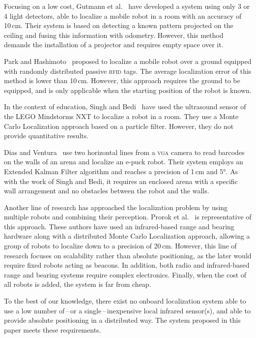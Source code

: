 \documentclass[letterpaper, 10pt, conference]{ieeeconf}
\begin{document}
Focusing on a low cost, Gutmann et al.~\cite{gutmann2013challenges} have developed a system using only 3 or 4 light detectors, able to localize a mobile robot in a room with an accuracy of 10\,cm.
Their system is based on detecting a known pattern projected on the ceiling and fusing this information with odometry.
However, this method demands the installation of a projector and requires empty space over it.

Park and Hashimoto~\cite{park2009approach} proposed to localize a mobile robot over a ground equipped with randomly distributed passive \textsc{rfid} tags.
The average localization error of this method is lower than 10\,cm.
However, this approach requires the ground to be equipped, and is only applicable when the starting position of the robot is known.

In the context of education, Singh and Bedi~\cite{singh2013map} have used the ultrasound sensor of the LEGO Mindstorms NXT to localize a robot in a room.
They use a Monte Carlo Localization approach based on a particle filter.
However, they do not provide quantitative results.

Dias and Ventura~\cite{dias2013absolute} use two horizontal lines from a \textsc{vga} camera to read barcodes on the walls of an arena and localize an e-puck robot.
Their system employs an Extended Kalman Filter algorithm and reaches a precision of 1\,cm and 5°.
As with the work of Singh and Bedi, it requires an enclosed arena with a specific wall arrangement and no obstacles between the robot and the walls.

Another line of research has approached the localization problem by using multiple robots and combining their perception.
Prorok et al.~\cite{prorok2012low} is representative of this approach.
These authors have used an infrared-based range and bearing hardware along with a distributed Monte Carlo Localization approach, allowing a group of robots to localize down to a precision of 20\,cm.
However, this line of research focuses on scalability rather than absolute positioning, as the later would require fixed robots acting as beacons.
In addition, both radio and infrared-based range and bearing systems require complex electronics.
Finally, when the cost of all robots is added, the system is far from cheap.

To the best of our knowledge, there exist no onboard localization system able to use a low number of\,--\,or a single\,--\,inexpensive local infrared sensor(s), and able to provide absolute positioning in a distributed way.
The system proposed in this paper meets these requirements.
\end{document}
